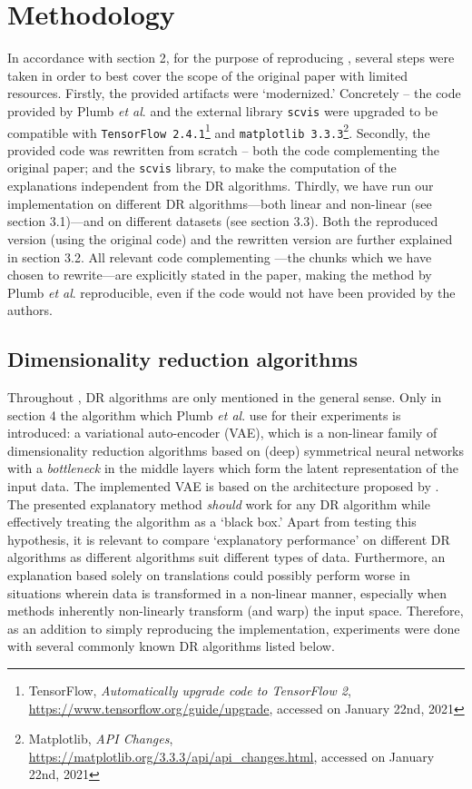 \section{Methodology}
In accordance with section 2, for the purpose of reproducing \citep{plumb2020explaining}, several steps were taken in order to best cover the scope of the original paper with limited resources. Firstly, the provided artifacts were `modernized.' Concretely -- the code provided by Plumb \textit{et al}. and the external library \texttt{scvis} were upgraded to be compatible with \texttt{TensorFlow 2.4.1}\footnote{TensorFlow, \textit{Automatically upgrade code to TensorFlow 2}, \url{https://www.tensorflow.org/guide/upgrade}, accessed on January 22nd, 2021} and \texttt{matplotlib 3.3.3}\footnote{Matplotlib, \textit{API Changes}, \url{https://matplotlib.org/3.3.3/api/api_changes.html}, accessed on January 22nd, 2021}. Secondly, the provided code was rewritten from scratch -- both the code complementing the original paper; and the \texttt{scvis} library, to make the computation of the explanations independent from the DR algorithms. Thirdly, we have run our implementation on different DR algorithms---both linear and non-linear (see section 3.1)---and on different datasets (see section 3.3). Both the reproduced version (using the original code) and the rewritten version are further explained in section 3.2. All relevant code complementing \cite{plumb2020explaining}---the chunks which we have chosen to rewrite---are explicitly stated in the paper, making the method by Plumb \textit{et al}. reproducible, even if the code would not have been provided by the authors. 

\subsection{Dimensionality reduction algorithms}
Throughout \cite{plumb2020explaining}, DR algorithms are only mentioned in the general sense. Only in section 4 the algorithm which Plumb \textit{et al}. use for their experiments is introduced: a variational auto-encoder (VAE), which is a non-linear family of dimensionality reduction algorithms based on (deep) symmetrical neural networks with a \textit{bottleneck} in the middle layers which form the latent representation of the input data. The implemented VAE is based on the architecture proposed by \cite{ding2018interpretable}.\\

The presented explanatory method \textit{should} work for any DR algorithm while effectively treating the algorithm as a `black box.' Apart from testing this hypothesis, it is relevant to compare `explanatory performance' on different DR algorithms as different algorithms suit different types of data. Furthermore, an explanation based solely on translations could possibly perform worse in situations wherein data is transformed in a non-linear manner, especially when methods inherently non-linearly transform (and warp) the input space. Therefore, as an addition to simply reproducing the implementation, experiments were done with several commonly known DR algorithms listed below.

